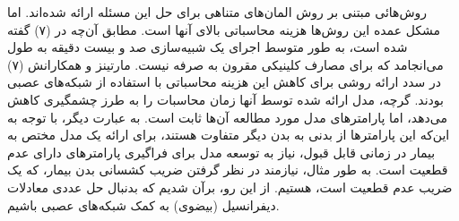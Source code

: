 روش‌هائی مبتنی بر روش المان‌های متناهی برای حل این مسئله ارائه شده‌اند. اما مشکل عمده این روش‌ها هزینه محاسباتی بالای آنها است. مطابق آن‌چه در (۷) گفته شده است، به طور متوسط اجرای  یک شبیه‌سازی صد و بیست دقیقه به طول می‌انجامد که برای مصارف کلینیکی مقرون به صرفه نیست. مارتینز و همکارانش (۷) در سدد ارائه روشی برای کاهش این هزینه محاسباتی با استفاده از شبکه‌های عصبی بودند. گرچه، مدل ارائه شده توسط آنها زمان محاسبات را به طرز چشمگیری کاهش می‌دهد، اما پارامترهای مدل مورد مطالعه آن‌ها ثابت است. به عبارت دیگر، با توجه به این‌که این پارامترها از بدنی به بدن دیگر متفاوت هستند، برای ارائه یک مدل مختص به بیمار در زمانی قابل قبول، نیاز به توسعه مدل برای فراگیری پارامترهای دارای عدم قطعیت است. به طور مثال، نیازمند در نظر گرفتن ضریب کشسانی بدن بیمار، که یک ضریب عدم قطعیت است، هستیم. از این رو، برآن شدیم که بدنبال حل عددی معادلات دیفرانسیل (بیضوی) به کمک شبکه‌های عصبی باشیم.\\ 
